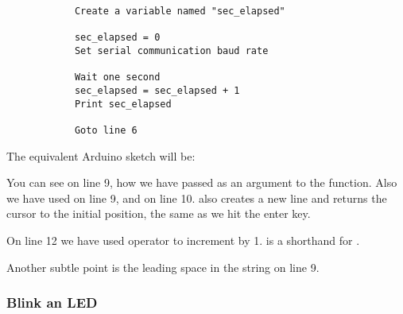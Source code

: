 \documentclass{article}
\begin{document}
			\begin{lstlisting}
			Create a variable named "sec_elapsed"

			sec_elapsed = 0
			Set serial communication baud rate

			Wait one second
			sec_elapsed = sec_elapsed + 1
			Print sec_elapsed

			Goto line 6
			\end{lstlisting}

			The equivalent Arduino sketch will be:

			

			You can see on line 9, how we have passed  as an argument to the  function. Also we have used  on line 9, and  on line 10.  also creates a new line and returns the cursor to the initial position, the same as we hit the enter key.

			On line 12 we have used \inlncd{+=} operator to increment  by 1.  is a shorthand for .

			Another subtle point is the leading space in the string on line 9.

		\subsubsection{Blink an LED}
			
\end{document}
